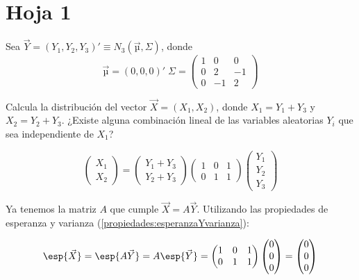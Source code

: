 \section{Hoja 1}

\begin{problem}[1]
Sea $\vec{Y} = (Y_1,Y_2,Y_3)' ≡ N_3(\vec{µ},Σ)$, donde \[\vec{µ} = (0,0,0)'\;
Σ =\begin{pmatrix}
1&0&0\\
0&2&−1\\
0&−1&2
\end{pmatrix}
\]


\ppart  Calcula la distribución del vector $\vec{X} = (X_1,X_2)$, donde $X_1 = Y_1 + Y_3$ y $X_2 = Y_2 + Y_3$.
\ppart ¿Existe alguna combinación lineal de las variables aleatorias $Y_i$ que sea independiente de $X_1$?

\solution
{}


\spart 
\[
\begin{pmatrix}X_1 \\ X_2 \end{pmatrix} = \begin{pmatrix} Y_1 + Y_3 \\ Y_2 + Y_3 \end{pmatrix} \begin{pmatrix} 1&0&1\\0&1&1 \end{pmatrix} \begin{pmatrix} Y_1\\Y_2\\Y_3 \end{pmatrix} 
\]

Ya tenemos la matriz $A$ que cumple $\vec{X} = A \vec{Y}$. Utilizando las propiedades de esperanza y varianza (\ref{propiedades:esperanzaYvarianza}):

\[\esp{\vec{X}} = \esp{A\vec{Y}} = A\esp{\vec{Y}} = \begin{pmatrix} 1&0&1\\0&1&1 \end{pmatrix} \begin{pmatrix} 0 \\0\\0\end{pmatrix} = \begin{pmatrix} 0 \\0\\0\end{pmatrix}\]


\end{problem}
